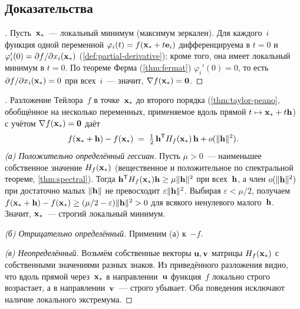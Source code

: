 \subsection*{Доказательства}

\begin{proof}[]
Пусть~$\mathbf{x}_*$~--- локальный минимум (максимум зеркален). Для
каждого~$i$ функция одной переменной
$\varphi_i(t) = f(\mathbf{x}_* + t\mathbf{e}_i)$ дифференцируема в $t = 0$
и $\varphi_i'(0) = \partial f / \partial x_i (\mathbf{x}_*)$
(\cref{def:partial-derivative}); кроме того, она имеет локальный
минимум в $t = 0$. По теореме Ферма (\cref{thm:fermat})
$\varphi_i'(0) = 0$, то есть
$\partial f / \partial x_i (\mathbf{x}_*) = 0$ при всех~$i$~--- значит,
$\nabla f(\mathbf{x}_*) = \mathbf{0}$.
\end{proof}

\begin{proof}[]
Разложение Тейлора~$f$ в точке~$\mathbf{x}_*$ до второго порядка
(\cref{thm:taylor-peano}, обобщённое на несколько переменных,
применяемое вдоль прямой $t \mapsto \mathbf{x}_* + t \mathbf{h}$) с
учётом $\nabla f(\mathbf{x}_*) = \mathbf{0}$ даёт
\[
  f(\mathbf{x}_* + \mathbf{h}) - f(\mathbf{x}_*) \;=\; \tfrac{1}{2}\, \mathbf{h}^{\mathsf{T}} H_f(\mathbf{x}_*)\, \mathbf{h} + o(\|\mathbf{h}\|^2).
\]
\emph{(а) Положительно определённый гессиан.} Пусть $\mu > 0$~---
наименьшее собственное значение $H_f(\mathbf{x}_*)$ (вещественное и
положительное по спектральной теореме, \cref{thm:spectral}). Тогда
$\mathbf{h}^{\mathsf{T}} H_f(\mathbf{x}_*) \mathbf{h} \ge \mu \|\mathbf{h}\|^2$ при
всех~$\mathbf{h}$, а член $o(\|\mathbf{h}\|^2)$ при достаточно малых
$\|\mathbf{h}\|$ не превосходит $\varepsilon \|\mathbf{h}\|^2$. Выбирая
$\varepsilon < \mu/2$, получаем
$f(\mathbf{x}_* + \mathbf{h}) - f(\mathbf{x}_*) \ge (\mu/2 - \varepsilon)\|\mathbf{h}\|^2 > 0$
для всякого ненулевого малого~$\mathbf{h}$. Значит, $\mathbf{x}_*$~---
строгий локальный минимум.

\emph{(б) Отрицательно определённый.} Применим (а) к~$-f$.

\emph{(в) Неопределённый.} Возьмём собственные векторы
$\mathbf{u}, \mathbf{v}$ матрицы $H_f(\mathbf{x}_*)$ с собственными
значениями разных знаков. Из приведённого разложения видно, что вдоль
прямой через~$\mathbf{x}_*$ в направлении~$\mathbf{u}$ функция~$f$
локально строго возрастает, а в направлении~$\mathbf{v}$~--- строго
убывает. Оба поведения исключают наличие локального экстремума.
\end{proof}

